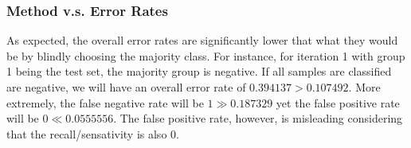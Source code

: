 \documentclass[letterpaper]{article}
\begin{document}
\subsubsection{Method v.s. Error Rates}
As expected, the overall error rates are significantly lower that what they would be by blindly choosing the majority class. For instance, for iteration 1 with group 1 being the test set, the majority group is negative. If all samples are classified are negative, we will have an overall error rate of $0.394137>0.107492.$ More extremely, the false negative rate will be $1\gg 0.187329$ yet the false positive rate will be $0\ll 0.0555556.$ The false positive rate, however, is misleading considering that the recall/sensativity is also $0.$

\label{LastPage}
\end{document}
